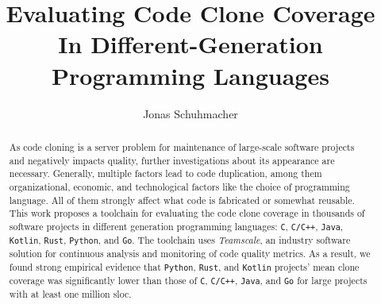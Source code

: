 \documentclass[runningheads]{llncs}
\def\teamscale{\textit{Teamscale}}
\begin{document}
%
\title{Evaluating Code Clone Coverage In Different-Generation Programming Languages}
%
%
%
\author{Jonas Schuhmacher}
%
\maketitle %
%
%
\begin{abstract}
As code cloning is a server problem for maintenance of large-scale software projects and negatively impacts quality, further investigations about its appearance are necessary. Generally, multiple factors lead to code duplication, among them organizational, economic, and technological factors like the choice of programming language. All of them strongly affect what code is fabricated or somewhat reusable.
This work proposes a toolchain for evaluating the code clone coverage in thousands of software projects in different generation programming languages: \texttt{C}, \texttt{C/C++}, \texttt{Java}, \texttt{Kotlin}, \texttt{Rust}, \texttt{Python}, and \texttt{Go}. The toolchain uses \teamscale{}, an industry software solution for continuous analysis and monitoring of code quality metrics.
As a result, we found strong empirical evidence that \texttt{Python}, \texttt{Rust}, and \texttt{Kotlin} projects' mean clone coverage was significantly lower than those of \texttt{C}, \texttt{C/C++}, \texttt{Java}, and \texttt{Go} for large projects with at least one million \acl{sloc}.

\end{abstract}
%
%







%
%
\appendix

%
%


%
\end{document}
